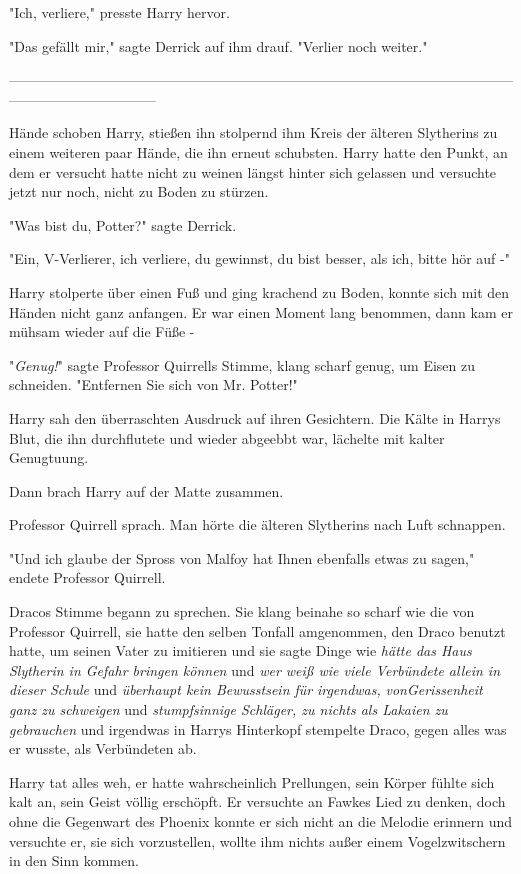 {"Ich, verliere," presste Harry hervor.

"Das gefällt mir," sagte Derrick auf ihm drauf. "Verlier noch weiter."

--------------------------------------------------------------------------------------------------------------------------------------------

Hände schoben Harry, stießen ihn stolpernd ihm Kreis der älteren Slytherins zu einem weiteren paar Hände, die ihn erneut schubsten. Harry hatte den Punkt, an dem er versucht hatte nicht zu weinen längst hinter sich gelassen und versuchte jetzt nur noch, nicht zu Boden zu stürzen.

"Was bist du, Potter?" sagte Derrick.

"Ein, V-Verlierer, ich verliere, du gewinnst, du bist besser, als ich, bitte hör auf -"

Harry stolperte über einen Fuß und ging krachend zu Boden, konnte sich mit den Händen nicht ganz anfangen. Er war einen Moment lang benommen, dann kam er mühsam wieder auf die Füße -

"\emph{Genug!}" sagte Professor Quirrells Stimme, klang scharf genug, um Eisen zu schneiden. "Entfernen Sie sich von Mr. Potter!"

Harry sah den überraschten Ausdruck auf ihren Gesichtern. Die Kälte in Harrys Blut, die ihn durchflutete und wieder abgeebbt war, lächelte mit kalter Genugtuung.

Dann brach Harry auf der Matte zusammen.

Professor Quirrell sprach. Man hörte die älteren Slytherins nach Luft schnappen.

"Und ich glaube der Spross von Malfoy hat Ihnen ebenfalls etwas zu sagen," endete Professor Quirrell.

Dracos Stimme begann zu sprechen. Sie klang beinahe so scharf wie die von Professor Quirrell, sie hatte den selben Tonfall amgenommen, den Draco benutzt hatte, um seinen Vater zu imitieren und sie sagte Dinge wie \emph{hätte das Haus Slytherin in Gefahr bringen können} und \emph{wer weiß wie viele Verbündete allein in dieser Schule} und \emph{überhaupt kein Bewusstsein für} \emph{irgendwas,} \emph{vonGerissenheit ganz zu schweigen} und \emph{stumpfsinnige Schläger, zu nichts als Lakaien zu gebrauchen} und irgendwas in Harrys Hinterkopf stempelte Draco, gegen alles was er wusste, als Verbündeten ab.

Harry tat alles weh, er hatte wahrscheinlich Prellungen, sein Körper fühlte sich kalt an, sein Geist völlig erschöpft. Er versuchte an Fawkes Lied zu denken, doch ohne die Gegenwart des Phoenix konnte er sich nicht an die Melodie erinnern und versuchte er, sie sich vorzustellen, wollte ihm nichts außer einem Vogelzwitschern in den Sinn kommen.

}
